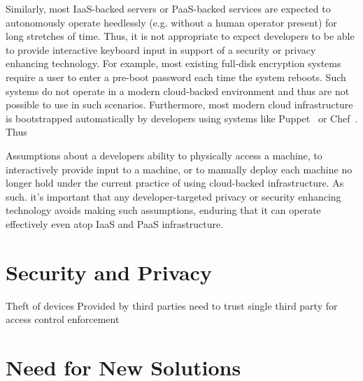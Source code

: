 Similarly, most IaaS-backed servers or PaaS-backed services are
expected to autonomously operate heedlessly (e.g. without a human
operator present) for long stretches of time. Thus, it is not
appropriate to expect developers to be able to provide interactive
keyboard input in support of a security or privacy enhancing
technology. For example, most existing full-disk encryption systems
require a user to enter a pre-boot password each time the system
reboots. Such systems do not operate in a modern cloud-backed
environment and thus are not possible to use in such
scenarios. Furthermore, most modern cloud infrastructure is
bootstrapped automatically by developers using systems like
Puppet~\cite{puppet} or Chef~\cite{chef}. Thus

Assumptions about a developers ability to physically access a machine,
to interactively provide input to a machine, or to manually deploy
each machine no longer hold under the current practice of using
cloud-backed infrastructure. As such. it's important that any
developer-targeted privacy or security enhancing technology avoids
making such assumptions, enduring that it can operate effectively even
atop IaaS and PaaS infrastructure.

\section{Security and Privacy}

Theft of devices
Provided by third parties
need to trust single third party for access control enforcement

\section{Need for New Solutions}

